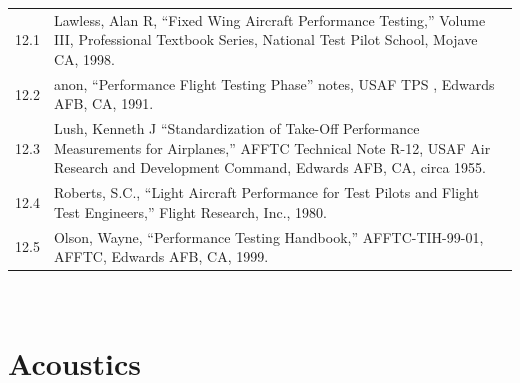 \documentclass[
]{book}
\begin{document}
\begin{longtable}[]{@{}ll@{}}
\toprule
\endhead
\begin{minipage}[t]{0.06\columnwidth}\raggedright
12.1\strut
\end{minipage} & \begin{minipage}[t]{0.88\columnwidth}\raggedright
Lawless, Alan R, ``Fixed Wing Aircraft Performance Testing,'' Volume III, Professional Textbook Series, National Test Pilot School, Mojave CA, 1998.\strut
\end{minipage}\tabularnewline
\begin{minipage}[t]{0.06\columnwidth}\raggedright
12.2\strut
\end{minipage} & \begin{minipage}[t]{0.88\columnwidth}\raggedright
anon, ``Performance Flight Testing Phase'' notes, USAF TPS , Edwards AFB, CA, 1991.\strut
\end{minipage}\tabularnewline
\begin{minipage}[t]{0.06\columnwidth}\raggedright
12.3\strut
\end{minipage} & \begin{minipage}[t]{0.88\columnwidth}\raggedright
Lush, Kenneth J ``Standardization of Take-Off Performance Measurements for Airplanes,'' AFFTC Technical Note R-12, USAF Air Research and Development Command, Edwards AFB, CA, circa 1955.\strut
\end{minipage}\tabularnewline
\begin{minipage}[t]{0.06\columnwidth}\raggedright
12.4\strut
\end{minipage} & \begin{minipage}[t]{0.88\columnwidth}\raggedright
Roberts, S.C., ``Light Aircraft Performance for Test Pilots and Flight Test Engineers,'' Flight Research, Inc., 1980.\strut
\end{minipage}\tabularnewline
\begin{minipage}[t]{0.06\columnwidth}\raggedright
12.5\strut
\end{minipage} & \begin{minipage}[t]{0.88\columnwidth}\raggedright
Olson, Wayne, ``Performance Testing Handbook,'' AFFTC-TIH-99-01, AFFTC, Edwards AFB, CA, 1999.\strut
\end{minipage}\tabularnewline
\bottomrule
\end{longtable}

~

\hypertarget{acoustics}{%
\chapter{Acoustics}\label{acoustics}}
\end{document}
